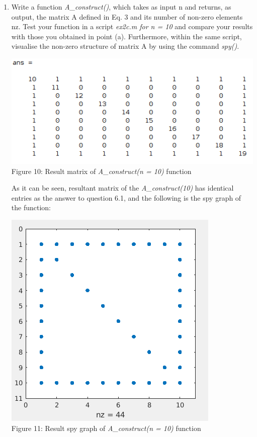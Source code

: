 \documentclass[unicode,11pt,a4paper,oneside,numbers=endperiod,openany]{scrartcl}
\begin{document}
\begin{enumerate}
{Where $\alpha$ equals to number of overlapping elements.}\\
{If we count all the borders of a square matrix, each of the edges will be counted twice so we need to minus four from our $5n$, now when we count the non-zero entries on the diagonal on top of our calculation made on entries on the border, two edges where $i=j, i=1,n$ will overlap once each. Hence, we need to minus another two from our $5n - 4$. Finally we get:}
\begin{center}
\begin{equation}
 total-non-zero-entries = 5n - 4 - 2 = 5n - 6
\end{equation}
\end{center}

\item Write a function \textit{A\_construct()}, which takes as input n and returns, as output, the matrix A defined in Eq. 3 and its number of non-zero elements nz. Test your function in a script \textit{ex2c.m for n = 10} and compare
your results with those you obtained in point (a). Furthermore, within the same script, visualise the non-zero
structure of matrix A by using the command \textit{spy()}.\\

\begin{center}
  \includegraphics[width=0.5\linewidth]{./images/n10matrix.png}\\
  \label{fig:Resultant matrix}
  {Figure 10: Result matrix of \textit{A\_construct(n = 10)} function}
\end{center}

{As it can be seen, resultant matrix of the \textit{A\_construct(10)} has identical entries as the answer to question 6.1, and the following is the spy graph of the function: }

\begin{center}
  \includegraphics[width=0.5\linewidth]{./images/n10spy.png}\\
  \label{fig:Resultant spy graph}
  {Figure 11: Result spy graph of \textit{A\_construct(n = 10)} function}
\end{center}


\end{enumerate}
\end{document}
